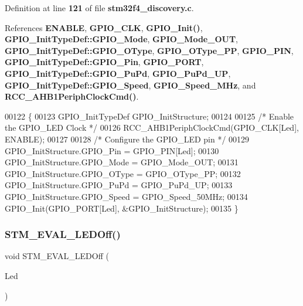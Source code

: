 Definition at line \textbf{ 121} of file \textbf{ stm32f4\+\_\+discovery.\+c}.



References \textbf{ E\+N\+A\+B\+LE}, \textbf{ G\+P\+I\+O\+\_\+\+C\+LK}, \textbf{ G\+P\+I\+O\+\_\+\+Init()}, \textbf{ G\+P\+I\+O\+\_\+\+Init\+Type\+Def\+::\+G\+P\+I\+O\+\_\+\+Mode}, \textbf{ G\+P\+I\+O\+\_\+\+Mode\+\_\+\+O\+UT}, \textbf{ G\+P\+I\+O\+\_\+\+Init\+Type\+Def\+::\+G\+P\+I\+O\+\_\+\+O\+Type}, \textbf{ G\+P\+I\+O\+\_\+\+O\+Type\+\_\+\+PP}, \textbf{ G\+P\+I\+O\+\_\+\+P\+IN}, \textbf{ G\+P\+I\+O\+\_\+\+Init\+Type\+Def\+::\+G\+P\+I\+O\+\_\+\+Pin}, \textbf{ G\+P\+I\+O\+\_\+\+P\+O\+RT}, \textbf{ G\+P\+I\+O\+\_\+\+Init\+Type\+Def\+::\+G\+P\+I\+O\+\_\+\+Pu\+Pd}, \textbf{ G\+P\+I\+O\+\_\+\+Pu\+Pd\+\_\+\+UP}, \textbf{ G\+P\+I\+O\+\_\+\+Init\+Type\+Def\+::\+G\+P\+I\+O\+\_\+\+Speed}, \textbf{ G\+P\+I\+O\+\_\+\+Speed\+\_\+M\+Hz}, and \textbf{ R\+C\+C\+\_\+\+A\+H\+B1\+Periph\+Clock\+Cmd()}.


\begin{DoxyCode}
00122 \{
00123   GPIO_InitTypeDef  GPIO\_InitStructure;
00124   
00125   \textcolor{comment}{/* Enable the GPIO\_LED Clock */}
00126   RCC_AHB1PeriphClockCmd(GPIO_CLK[Led], ENABLE);
00127 
00128   \textcolor{comment}{/* Configure the GPIO\_LED pin */}
00129   GPIO\_InitStructure.GPIO_Pin = GPIO_PIN[Led];
00130   GPIO\_InitStructure.GPIO_Mode = GPIO_Mode_OUT;
00131   GPIO\_InitStructure.GPIO_OType = GPIO_OType_PP;
00132   GPIO\_InitStructure.GPIO_PuPd = GPIO_PuPd_UP;
00133   GPIO\_InitStructure.GPIO_Speed = GPIO_Speed_50MHz;
00134   GPIO_Init(GPIO_PORT[Led], &GPIO\_InitStructure);
00135 \}
\end{DoxyCode}
\mbox{\label{group__STM32F4__DISCOVERY__LOW__LEVEL__Private__Functions_gab9ab7deafd606e72d72580ec974b7757}} 
\subsubsection{S\+T\+M\+\_\+\+E\+V\+A\+L\+\_\+\+L\+E\+D\+Off()}
{\footnotesize\ttfamily void S\+T\+M\+\_\+\+E\+V\+A\+L\+\_\+\+L\+E\+D\+Off (\begin{DoxyParamCaption}\item[{\textbf{ Led\+\_\+\+Type\+Def}}]{Led }\end{DoxyParamCaption})}



